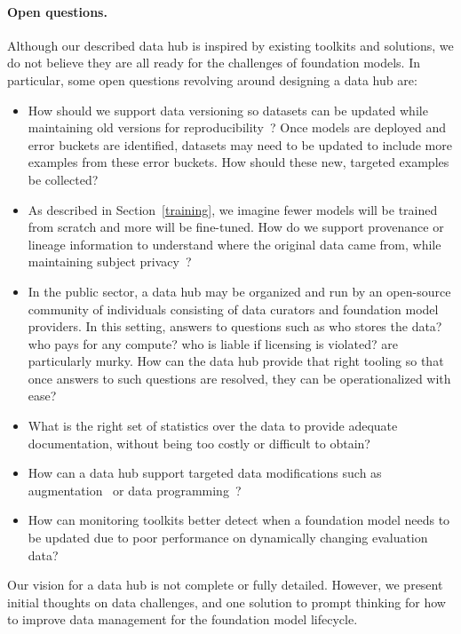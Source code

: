 \paragraph{Open questions.} Although our described data hub is inspired by existing toolkits and solutions, we do not believe they are all ready for the challenges of foundation models. In particular, some open questions revolving around designing a data hub are:

\begin{itemize}
    \item How should we support data versioning so datasets can be updated while maintaining old versions for reproducibility~\citep{agrawal2019cloudy}? Once models are deployed and error buckets are identified, datasets may need to be updated to include more examples from these error buckets. How should these new, targeted examples be collected?
    \item As described in Section~\ref{training}, we imagine fewer models will be trained from scratch and more will be fine-tuned. How do we support provenance or lineage information to understand where the original data came from, while maintaining subject privacy~\citep{chen2015access}?
    \item In the public sector, a data hub may be organized and run by an open-source community of individuals consisting of data curators and foundation model providers. In this setting, answers to questions such as who stores the data? who pays for any compute? who is liable if licensing is violated? are particularly murky. How can the data hub provide that right tooling so that once answers to such questions are resolved, they can be operationalized with ease?
    \item What is the right set of statistics over the data to provide adequate documentation, without being too costly or difficult to obtain?
    \item How can a data hub support targeted data modifications such as augmentation~\citep{ma2019nlpaug, shorten2019survey} or data programming~\citep{ratner2017snorkel}?
    \item How can monitoring toolkits better detect when a foundation model needs to be updated due to poor performance on dynamically changing evaluation data?
\end{itemize}

Our vision for a data hub is not complete or fully detailed. However, we present initial thoughts on data challenges, and one solution to prompt thinking for how to improve data management for the foundation model lifecycle.

